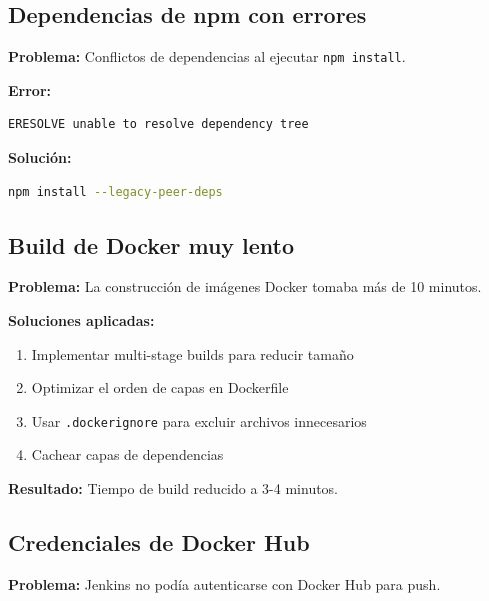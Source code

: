 \documentclass[12pt,a4paper]{article}
\begin{document}
\subsection{Dependencias de npm con errores}

\textbf{Problema:} Conflictos de dependencias al ejecutar \texttt{npm install}.

\textbf{Error:}
\begin{lstlisting}
ERESOLVE unable to resolve dependency tree
\end{lstlisting}

\textbf{Solución:}
\begin{lstlisting}[language=bash]
npm install --legacy-peer-deps
\end{lstlisting}

\subsection{Build de Docker muy lento}

\textbf{Problema:} La construcción de imágenes Docker tomaba más de 10 minutos.

\textbf{Soluciones aplicadas:}
\begin{enumerate}
    \item Implementar multi-stage builds para reducir tamaño
    \item Optimizar el orden de capas en Dockerfile
    \item Usar \texttt{.dockerignore} para excluir archivos innecesarios
    \item Cachear capas de dependencias
\end{enumerate}

\textbf{Resultado:} Tiempo de build reducido a 3-4 minutos.

\subsection{Credenciales de Docker Hub}

\textbf{Problema:} Jenkins no podía autenticarse con Docker Hub para push.
\end{document}
